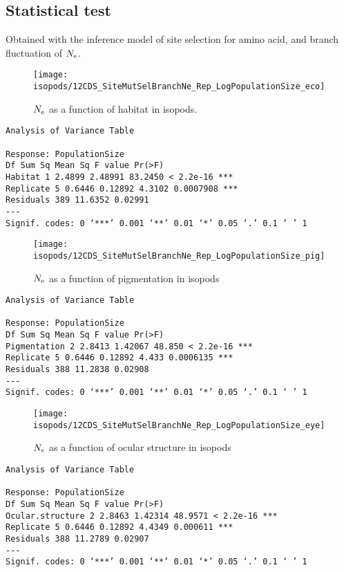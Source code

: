 \subsection{Statistical test}
Obtained with the inference model of site selection for amino acid, and branch fluctuation of $\Ne$.

\begin{figure}[H]
    \centering
    \texttt{[image: isopods/12CDS\_SiteMutSelBranchNe\_Rep\_LogPopulationSize\_eco]}
    \caption[$\Ne$ as a function of habitat in isopods]{$\Ne$ as a function of habitat in isopods.}
\end{figure}
\begin{verbatim}
Analysis of Variance Table

Response: PopulationSize
Df Sum Sq Mean Sq F value Pr(>F) 
Habitat 1 2.4899 2.48991 83.2450 < 2.2e-16 ***
Replicate 5 0.6446 0.12892 4.3102 0.0007908 ***
Residuals 389 11.6352 0.02991 
---
Signif. codes: 0 ‘***’ 0.001 ‘**’ 0.01 ‘*’ 0.05 ‘.’ 0.1 ‘ ’ 1
\end{verbatim}
\begin{figure}[H]
    \centering
    \texttt{[image: isopods/12CDS\_SiteMutSelBranchNe\_Rep\_LogPopulationSize\_pig]}
    \caption[$\Ne$ as a function of pigmentation in isopods]{$\Ne$ as a function of pigmentation in isopods}
\end{figure}
\begin{verbatim}
Analysis of Variance Table

Response: PopulationSize
Df Sum Sq Mean Sq F value Pr(>F) 
Pigmentation 2 2.8413 1.42067 48.850 < 2.2e-16 ***
Replicate 5 0.6446 0.12892 4.433 0.0006135 ***
Residuals 388 11.2838 0.02908 
---
Signif. codes: 0 ‘***’ 0.001 ‘**’ 0.01 ‘*’ 0.05 ‘.’ 0.1 ‘ ’ 1
\end{verbatim}
\begin{figure}[H]
    \centering
    \texttt{[image: isopods/12CDS\_SiteMutSelBranchNe\_Rep\_LogPopulationSize\_eye]}
    \caption[$\Ne$ as a function of ocular structure in isopods]{$\Ne$ as a function of ocular structure in isopods}
\end{figure}
\begin{verbatim}
Analysis of Variance Table

Response: PopulationSize
Df Sum Sq Mean Sq F value Pr(>F) 
Ocular.structure 2 2.8463 1.42314 48.9571 < 2.2e-16 ***
Replicate 5 0.6446 0.12892 4.4349 0.000611 ***
Residuals 388 11.2789 0.02907 
---
Signif. codes: 0 ‘***’ 0.001 ‘**’ 0.01 ‘*’ 0.05 ‘.’ 0.1 ‘ ’ 1
\end{verbatim}
